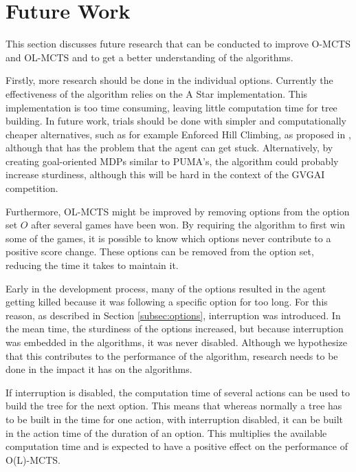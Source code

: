\section{Future Work}
This section discusses future research that can be conducted to improve O-MCTS
and OL-MCTS and to get a better understanding of the algorithms. 

Firstly, more research should be done in the individual options. Currently the
effectiveness of the algorithm relies on the A Star implementation.  This
implementation is too time consuming, leaving little computation time for tree
building. In future work, trials should be done with simpler and computationally
cheaper alternatives, such as for example Enforced Hill Climbing, as proposed in
\cite{ross2014general}, although that has the problem that the agent can get
stuck. Alternatively, by creating goal-oriented MDPs similar to PUMA's, the
algorithm could probably increase sturdiness, although this will be hard in the
context of the GVGAI competition.

Furthermore, OL-MCTS might be improved by removing options from the option set
$O$ after several games have been won. By requiring the algorithm to first win
some of the games, it is possible to know which options never contribute to a
positive score change. These options can be removed from the option set,
reducing the time it takes to maintain it.

Early in the development process, many of the options resulted in the agent
getting killed because it was following a specific option for too long. For this
reason, as described in Section \ref{subsec:options}, interruption was
introduced. In the mean time, the sturdiness of the options increased, but
because interruption was embedded in the algorithms, it was never disabled.
Although we hypothesize that this contributes to the performance of the
algorithm, research needs to be done in the impact it has on the algorithms.

If interruption is disabled, the computation time of several actions can be
used to build the tree for the next option. This means that whereas normally a
tree has to be built in the time for one action, with interruption disabled, it
can be built in the action time of the duration of an option. This multiplies
the available computation time and is expected to have a positive effect on the
performance of O(L)-MCTS.

